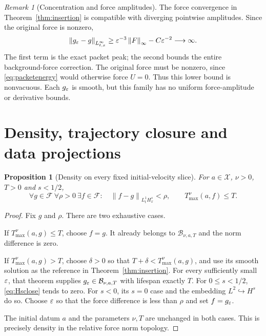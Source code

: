 \documentclass[11pt,a4paper]{article}
\newtheorem{proposition}[theorem]{Proposition}
\theoremstyle{definition}\newtheorem{definition}[theorem]{Definition}
\theoremstyle{remark}\newtheorem{remark}[theorem]{Remark}
\newcommand{\FF}{\mathcal F}\newcommand{\XX}{\mathcal X}
\newcommand{\BB}{\mathcal B}\newcommand{\PP}{\mathbb P}
\newcommand{\norm}[1]{\left\lVert#1\right\rVert}
\begin{document}
\begin{remark}[Concentration and force amplitudes]\label{rem:peaks}
The force convergence in Theorem~\ref{thm:insertion} is compatible with diverging pointwise amplitudes. Since the original force is nonzero,
\[
 \norm{g_\eps-g}_{L^\infty_{t,x}}
 \ge\eps^{-3}\norm{F}_\infty-C\eps^{-2}\longrightarrow\infty.
\]
The first term is the exact packet peak; the second bounds the entire background-force correction. The original force must be nonzero, since \eqref{eq:packetenergy} would otherwise force $U=0$. Thus this lower bound is nonvacuous. Each $g_\varepsilon$ is smooth, but this family has no uniform force-amplitude or derivative bounds.
\end{remark}

\section{Density, trajectory closure and data projections}\label{sec:density}
\begin{proposition}[Density on every fixed initial-velocity slice]\label{prop:density}
For $a\in\XX$, $\nu>0$, $T>0$ and $s<1/2$,
\[
 \forall g\in\FF\ \forall\rho>0\ \exists f\in\FF:
 \quad \norm{f-g}_{L^1_tH^s_x}<\rho,\qquad
       T_{\max}^{\nu}(a,f)\le T.
\]
\end{proposition}
\begin{proof}
Fix $g$ and $\rho$. There are two exhaustive cases.

If $T_{\max}^{\nu}(a,g)\le T$, choose $f=g$. It already belongs to
$\BB_{\nu,a,T}$ and the norm difference is zero.

If $T_{\max}^{\nu}(a,g)>T$, choose $\delta>0$ so that
$T+\delta<T_{\max}^{\nu}(a,g)$, and use its smooth solution as the reference in Theorem~\ref{thm:insertion}. For every sufficiently small $\varepsilon$, that theorem supplies $g_\eps\in\BB_{\nu,a,T}$ with lifespan exactly $T$.
For $0\le s<1/2$, \eqref{eq:Hsclose} tends to zero. For $s<0$, its $s=0$ case and the embedding $L^2\hookrightarrow H^s$ do so. Choose $\varepsilon$ so that the force difference is less than $\rho$ and set $f=g_\varepsilon$.

The initial datum $a$ and the parameters $\nu,T$ are unchanged in both cases. This is precisely density in the relative force norm topology.
\end{proof}
\end{document}
